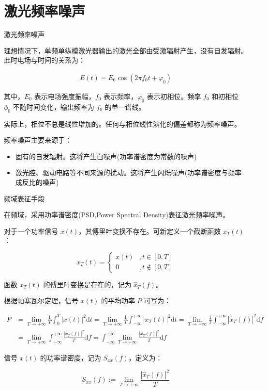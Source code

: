 \documentclass{beamer}
\begin{document}
\section{激光频率噪声}
\begin{frame}{激光频率噪声}

    理想情况下，单频单纵模激光器输出的激光全部由受激辐射产生，没有自发辐射。此时电场与时间的关系为：

    $$
    \begin{aligned}
    E(t)=E_0\cos(2\pi f_0 t+\varphi_0)
    \end{aligned}
    $$
    
    其中，$E_0 $ 表示电场强度振幅，$f_0 $ 表示频率，$\varphi_0 $ 表示初相位。频率 $f_0 $ 和初相位 $\phi_0 $ 不随时间变化，输出频率为 $f_0 $ 的单一谱线。

    实际上，相位不总是线性增加的。任何与相位线性演化的偏差都称为频率噪声。

    频率噪声主要来源于：

    \begin{itemize}
        \item 固有的自发辐射。这将产生白噪声(功率谱密度为常数的噪声)
        \item 激光腔、驱动电路等不同来源的扰动。这将产生闪烁噪声(功率谱密度与频率成反比的噪声)
    \end{itemize} 

\end{frame}

\begin{frame}{频域表征手段}

    在频域，采用功率谱密度(PSD,Power Spectral Density)表征激光频率噪声。

    对于一个功率信号 $x(t)$，其傅里叶变换不存在。可新定义一个截断函数 $x_T(t)$：

    $$
    x_T(t)=
    \begin{cases}
        x(t)&,t\in [0,T] \\
        0&,t\notin [0,T]
    \end{cases}
    $$

    函数 $x_T(t)$ 的傅里叶变换是存在的，记为 $\hat{x}_T(f) $。

    根据帕塞瓦尔定理，信号 $x(t)$ 的平均功率 $P$ 可写为：

    $$
    \begin{aligned}
    P
    &=\lim_{T\to +\infty}\frac{1}{T} \int_{0}^{T} |x(t)|^2\mathrm{d}t
    =\lim_{T\to +\infty}\frac{1}{T} \int_{-\infty}^{+\infty} |x_T(t)|^2\mathrm{d}t 
    =\lim_{T\to +\infty}\frac{1}{T} \int_{-\infty}^{+\infty} |\hat{x}_T(f)|^2\mathrm{d}f \\
    &=\lim_{T\to +\infty} \int_{-\infty}^{+\infty} \frac{|\hat{x}_T(f)|^2}{T}\mathrm{d}f
    =\int_{-\infty}^{+\infty} \lim_{T\to +\infty} \frac{|\hat{x}_T(f)|^2}{T}\mathrm{d}f
    \end{aligned}
    $$

    信号 $x(t)$ 的功率谱密度，记为 $S_{xx}(f)$，定义为：

    $$
    S_{xx}(f)
    :=\lim_{T\to +\infty} \frac{|\hat{x}_T(f)|^2}{T}
    $$
    
\end{frame}
\end{document}
